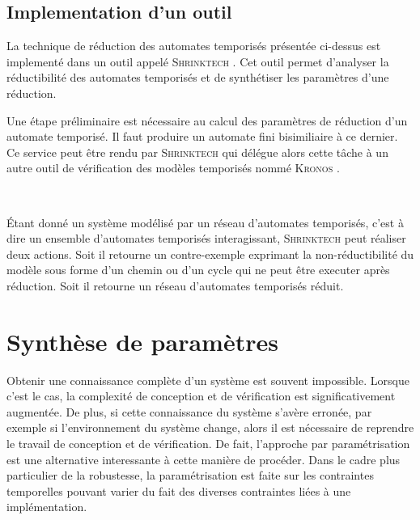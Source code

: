    \subsection{Implementation d'un outil}
    
      La technique de réduction des automates temporisés présentée ci-dessus est
      implementé dans un outil appelé \textsc{Shrinktech} \cite{sankur13}. Cet
      outil permet d'analyser la réductibilité des automates temporisés et de
      synthétiser les paramètres d'une réduction.
      
      Une étape préliminaire est nécessaire au calcul des paramètres de
      réduction d'un automate temporisé. Il faut produire un automate fini
      bisimiliaire à ce dernier. Ce service peut être rendu par
      \textsc{Shrinktech} qui délégue alors cette tâche à un autre outil de
      vérification des modèles temporisés nommé \textsc{Kronos} \cite{yovine97}.

      ~

      Étant donné un système modélisé par un réseau d'automates temporisés,
      c'est à dire un ensemble d'automates temporisés interagissant,
      \textsc{Shrinktech} peut réaliser deux actions. Soit il retourne un
      contre-exemple exprimant la non-réductibilité du modèle sous forme d'un
      chemin ou d'un cycle qui ne peut être executer après réduction. Soit il
      retourne un réseau d'automates temporisés réduit.

  \section{Synthèse de paramètres}
  \label{sec:parameter-synthesis}


    Obtenir une connaissance complète d'un système est souvent
    impossible. Lorsque c'est le cas, la complexité de conception et de
    vérification est significativement augmentée. De plus, si cette connaissance
    du système s'avère erronée, par exemple si l'environnement du système
    change, alors il est nécessaire de reprendre le travail de conception et de
    vérification. De fait, l'approche par paramétrisation est une alternative
    interessante à cette manière de procéder. Dans le cadre plus particulier de
    la robustesse, la paramétrisation est faite sur les contraintes temporelles
    pouvant varier du fait des diverses contraintes liées à une implémentation.

